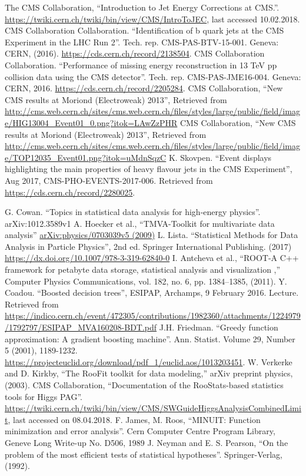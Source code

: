\documentclass[print]{nuthesis}
\begin{document}
\begin{thebibliography}{300}
 The CMS Collaboration, ``Introduction to Jet Energy Corrections at CMS.''. \url{https://twiki.cern.ch/twiki/bin/view/CMS/IntroToJEC}, last accessed 10.02.2018. 
CMS Collaboration Collaboration. ``Identification of b quark jets at the CMS Experiment in the LHC Run 2''. Tech. rep. CMS-PAS-BTV-15-001. Geneva: CERN, (2016). \url{https://cds.cern.ch/record/2138504}.
CMS Collaboration Collaboration. ``Performance of missing energy reconstruction in 13 TeV pp collision data using the CMS detector''. Tech. rep. CMS-PAS-JME16-004. Geneva: CERN, 2016. \url{https://cds.cern.ch/record/2205284}.
CMS Collaboration, ``New CMS results at Moriond (Electroweak) 2013'', Retrieved from \url{http://cms.web.cern.ch/sites/cms.web.cern.ch/files/styles/large/public/field/image/HIG13004\_Event01\_0.png?itok=LAwZzPHR}
 CMS Collaboration, ``New CMS results at Moriond (Electroweak) 2013'', Retrieved from \url{http://cms.web.cern.ch/sites/cms.web.cern.ch/files/styles/large/public/field/image/TOP12035\_Event01.png?itok=uMdnSqzC}
 K. Skovpen. ``Event displays highlighting the main properties of heavy flavour jets in the CMS Experiment'', Aug 2017, CMS-PHO-EVENTS-2017-006. Retrieved from \url{https://cds.cern.ch/record/2280025}.


 G. Cowan. ``Topics in statistical data analysis for high-energy physics''. arXiv:1012.3589v1
  A. Hoecker et al., ``TMVA-Toolkit for multivariate data analysis'' \href{https://arxiv.org/pdf/physics/0703039.pdf}{arXiv:physics/0703039v5 (2009)} 
 L. Lista. ``Statistical Methods for Data Analysis in Particle Physics'', 2nd ed. Springer International Publishing. (2017) \url{https://dx.doi.org/10.1007/978-3-319-62840-0}
 I. Antcheva et al., ``ROOT-A C++ framework for petabyte data storage, statistical analysis and visualization ,'' Computer Physics Communications, vol. 182, no. 6, pp. 1384–1385, (2011).
 Y. Coadou. ``Boosted decision trees'', ESIPAP, Archamps, 9 February 2016. Lecture. Retrieved from \url{https://indico.cern.ch/event/472305/contributions/1982360/attachments/1224979/1792797/ESIPAP_MVA160208-BDT.pdf}
 J.H. Friedman. ``Greedy function approximation: A gradient boosting machine''. Ann. Statist. Volume 29, Number 5 (2001), 1189-1232. \url{https://projecteuclid.org/download/pdf_1/euclid.aos/1013203451}.
 W. Verkerke and D. Kirkby, ``The RooFit toolkit for data modeling,'' arXiv preprint physics, (2003).
 CMS Collaboration, ``Documentation of the RooStats-based statistics tools for Higgs PAG''. \url{https://twiki.cern.ch/twiki/bin/view/CMS/SWGuideHiggsAnalysisCombinedLimit}, last accessed on 08.04.2018.
  F. James, M. Roos, ``MINUIT: Function minimization and error analysis''. Cern Computer Centre Program Library, Geneve Long Write-up No. D506, 1989
 J. Neyman and E. S. Pearson, ``On the problem of the most efficient tests of statistical hypotheses''. Springer-Verlag, (1992).


\end{thebibliography}
\end{document}
